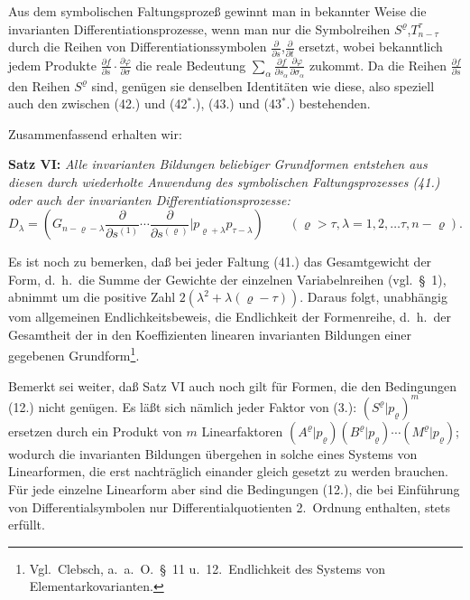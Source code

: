 \documentclass[12pt,a4paper]{article}
\begin{document}
Aus dem symbolischen Faltungsprozeß gewinnt man in bekannter Weise die invarianten Differentiationsprozesse, wenn man nur die Symbolreihen $S^{\varrho}$,$T^{\tau}_{n-\tau}$ durch die Reihen von Differentiationssymbolen $\frac{\partial}{\partial s}$,$\frac{\partial}{\partial t}$ ersetzt, wobei bekanntlich jedem Produkte $\frac{\partial f}{\partial s} \cdot \frac{\partial \varphi}{\partial \sigma}$ die reale Bedeutung $\sum_{\alpha} \frac{\partial f}{\partial s_{\alpha}} \frac{\partial \varphi}{\partial \sigma_{\alpha}}$ zukommt. Da die Reihen $\frac{\partial f}{\partial s}$ den Reihen $S^{\varrho}$ sind, genügen sie denselben Identitäten wie diese, also speziell auch den zwischen (42.) und (42$^{*}$.), (43.) und (43$^{*}$.) bestehenden.

Zusammenfassend erhalten wir:

\medskip
\textbf{Satz VI:} \textit{Alle invarianten Bildungen beliebiger Grundformen entstehen aus diesen durch wiederholte Anwendung des symbolischen Faltungsprozesses (41.) oder auch der invarianten Differentiationsprozesse:}
\begin{equation}\tag{45}
D_{\lambda} = (G_{n-\varrho-\lambda} \frac{\partial}{\partial s^{(1)}} \cdots \frac{\partial}{\partial s^{(\varrho)}} | p_{\varrho+\lambda} p_{\tau-\lambda}) \qquad (\varrho > \tau, \lambda = 1, 2, \ldots \tau, n-\varrho).
\end{equation}
\medskip

Es ist noch zu bemerken, daß bei jeder Faltung (41.) das Gesamtgewicht der Form, d.\ h.\ die Summe der Gewichte der einzelnen Variabelnreihen (vgl.\ \S\ 1), abnimmt um die positive Zahl $2(\lambda^{2} + \lambda(\varrho-\tau))$. Daraus folgt, unabhängig vom allgemeinen Endlichkeitsbeweis, die Endlichkeit der Formenreihe, d.\ h.\ der Gesamtheit der in den Koeffizienten linearen invarianten Bildungen einer gegebenen Grundform\footnote{Vgl.\ Clebsch, a.\ a.\ O.\ \S\ 11 u.\ 12.\ Endlichkeit des Systems von Elementarkovarianten.}.

Bemerkt sei weiter, daß Satz VI auch noch gilt für Formen, die den Bedingungen (12.) nicht genügen. Es läßt sich nämlich jeder Faktor von (3.): $(S^{\varrho} | p_{\varrho})^{m}$ ersetzen durch ein Produkt von $m$ Linearfaktoren $(A^{\varrho} | p_{\varrho})(B^{\varrho} | p_{\varrho}) \cdots (M^{\varrho} | p_{\varrho})$; wodurch die invarianten Bildungen übergehen in solche eines Systems von Linearformen, die erst nachträglich einander gleich gesetzt zu werden brauchen. Für jede einzelne Linearform aber sind die Bedingungen (12.), die bei Einführung von Differentialsymbolen nur Differentialquotienten 2.\ Ordnung enthalten, stets erfüllt.
\end{document}
